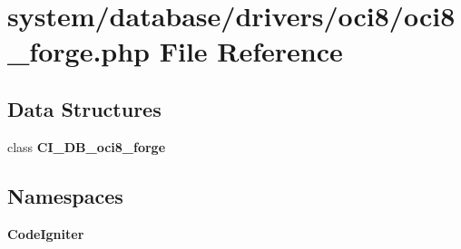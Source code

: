 \section{system/database/drivers/oci8/oci8\-\_\-forge.php File Reference}
\label{oci8__forge_8php}
\subsection*{Data Structures}
\begin{DoxyCompactItemize}
\item 
class {\bf C\-I\-\_\-\-D\-B\-\_\-oci8\-\_\-forge}
\end{DoxyCompactItemize}
\subsection*{Namespaces}
\begin{DoxyCompactItemize}
\item 
{\bf Code\-Igniter}
\end{DoxyCompactItemize}

